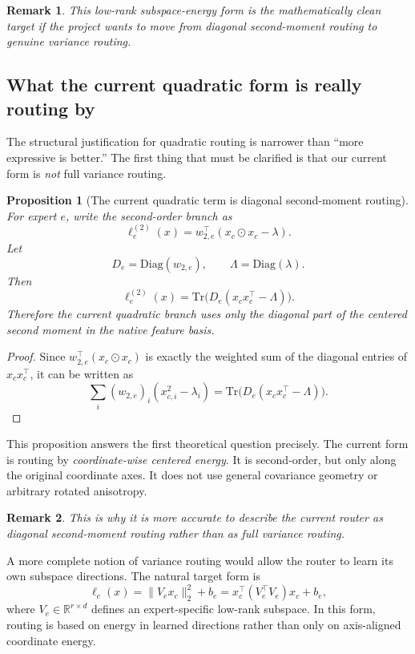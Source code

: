 \documentclass[11pt]{article}
\newtheorem{proposition}{Proposition}
\newtheorem{remark}{Remark}
\begin{document}
\begin{remark}
This low-rank subspace-energy form is the mathematically clean target if the project wants to move from diagonal second-moment routing to genuine variance routing.
\end{remark}

\subsection{What the current quadratic form is really routing by}

The structural justification for quadratic routing is narrower than ``more expressive is better.'' The first thing that must be clarified is that our current form is \emph{not} full variance routing.

\begin{proposition}[The current quadratic term is diagonal second-moment routing]
For expert $e$, write the second-order branch as
\[
\ell^{(2)}_e(x)
=
w_{2,e}^{\top}(x_c\odot x_c-\lambda).
\]
Let
\[
D_e=\mathrm{Diag}(w_{2,e}),
\qquad
\Lambda=\mathrm{Diag}(\lambda).
\]
Then
\[
\ell^{(2)}_e(x)
=
\mathrm{Tr}\!\big(D_e(x_cx_c^{\top}-\Lambda)\big).
\]
Therefore the current quadratic branch uses only the diagonal part of the centered second moment in the native feature basis.
\end{proposition}

\begin{proof}
Since $w_{2,e}^{\top}(x_c\odot x_c)$ is exactly the weighted sum of the diagonal entries of $x_cx_c^{\top}$, it can be written as
\[
\sum_i (w_{2,e})_i (x_{c,i}^2-\lambda_i)
=
\mathrm{Tr}\!\big(D_e(x_cx_c^\top-\Lambda)\big).
\]
\end{proof}

This proposition answers the first theoretical question precisely. The current form is routing by \emph{coordinate-wise centered energy}. It is second-order, but only along the original coordinate axes. It does not use general covariance geometry or arbitrary rotated anisotropy.

\begin{remark}
This is why it is more accurate to describe the current router as \emph{diagonal second-moment routing} rather than as full variance routing.
\end{remark}

A more complete notion of variance routing would allow the router to learn its own subspace directions. The natural target form is
\[
\ell_e(x)=\|V_e x_c\|_2^2+b_e
=
x_c^{\top}(V_e^{\top}V_e)x_c+b_e,
\]
where $V_e \in \mathbb{R}^{r\times d}$ defines an expert-specific low-rank subspace. In this form, routing is based on energy in learned directions rather than only on axis-aligned coordinate energy.
\end{document}
